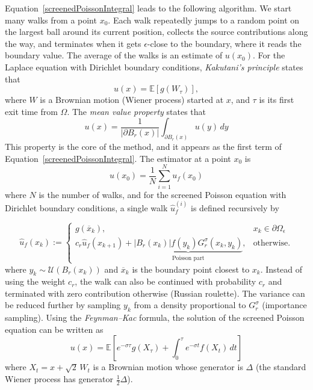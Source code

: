 \documentclass[
]{elteiktdk}[2024/04/26]
\begin{document}
	Equation~\eqref{screenedPoissonIntegral} leads to the following algorithm. We start many walks from a point $x_0$. Each walk repeatedly jumps to a random point on the largest ball around its current position, collects the source contributions along the way, and terminates when it gets $\epsilon$-close to the boundary, where it reads the boundary value. The average of the walks is an estimate of $u(x_0)$. For the Laplace equation with Dirichlet boundary conditions, \textit{Kakutani's principle} states that
	\begin{equation}
		u(x) = \mathbb{E}\left[g(W_\tau)\right],
	\end{equation}
	where $W$ is a Brownian motion (Wiener process) started at $x$, and $\tau$ is its first exit time from $\Omega$. The \textit{mean value property} \cite{axler2001harmonic} states that
	\begin{equation}
		u(x) = \frac{1}{|\partial B_r(x)|}\int_{\partial B_r(x)} u(y) \, dy
	\end{equation}
	This property is the core of the method, and it appears as the first term of Equation~\eqref{screenedPoissonIntegral}. The estimator at a point $x_0$ is
	\begin{equation}
		u(x_0) = \frac{1}{N} \sum_{i=1}^{N} \widehat{u_f}(x_0)
	\end{equation} 
	where $N$ is the number of walks, and for the screened Poisson equation with Dirichlet boundary conditions, a single walk $\widehat{u}^{(i)}_f$ is defined recursively by
	
	\begin{equation}
		\widehat{u}_f(x_k) :=
		\begin{cases}
			g(\overline{x}_k), & x_k \in \partial\Omega_\epsilon \\
			c_r \widehat{u}_f(x_{k+1}) + \underbrace{\left| B_r(x_k) \right| f (y_k) G^{\sigma}_r(x_k, y_k)}_{\text{Poisson part}}, & \text{otherwise.}
		\end{cases}
	\end{equation}
	where $y_k\sim\mathcal U(B_r(x_k))$ and $\overline{x}_k$ is the boundary point closest to $x_k$. Instead of using the weight $c_r$, the walk can also be continued with probability $c_r$ and terminated with zero contribution otherwise (Russian roulette). The variance can be reduced further by sampling $y_k$ from a density proportional to $G^\sigma_r$ (importance sampling). Using the \textit{Feynman--Kac} formula, the solution of the screened Poisson equation can be written as
	\begin{equation}
		u(x) = \mathbb{E}\left[e^{-\sigma\tau} g(X_{\tau}) + \int_0^{\tau} e^{-\sigma t} f(X_t) \, dt\right]
	\end{equation}
	where $X_t = x + \sqrt{2}\,W_t$ is a Brownian motion whose generator is $\Delta$ (the standard Wiener process has generator $\frac{1}{2}\Delta$).
	
\end{document}
